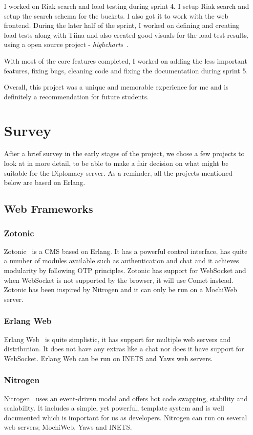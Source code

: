 \documentclass[11pt,a4paper]{report}
\begin{document}
I worked on Riak search and load testing during sprint 4. I setup Riak search
and setup the search schema for the buckets. I also got it to work with the web
frontend. During the later half of the sprint, I worked on defining and creating
load tests along with Tiina and also created good visuals for the load test
results, using a open source project - \emph{highcharts}~\cite{highcharts}.

With most of the core features completed, I worked on adding the less important
features, fixing bugs, cleaning code and fixing the documentation during sprint
5.

Overall, this project was a unique and memorable experience for me and is
definitely a recommendation for future students.
\chapter{Survey}
\label{appendix_b}
After a brief survey in the early stages of the project, we chose a few projects
to look at in more detail, to be able to make a fair decision on what might be
suitable for the Diplomacy server. As a reminder, all the projects mentioned
below are based on Erlang.

\section{Web Frameworks}
\subsection{Zotonic}
Zotonic~\cite{zotonic} is a CMS based on Erlang. It has a powerful control
interface, has quite a number of modules available such as authentication and
chat and it achieves modularity by following OTP principles. Zotonic has support
for WebSocket and when WebSocket is not supported by the browser, it will
use Comet instead. Zotonic has been inspired by Nitrogen and it can only be run
on a MochiWeb server.

\subsection{Erlang Web}
Erlang Web~\cite{erlangweb} is quite simplistic, it has support for multiple web
servers and distribution. It does not have any extras like a chat nor does it
have support for WebSocket. Erlang Web can be run on INETS and Yaws web
servers.

\subsection{Nitrogen}
Nitrogen~\cite{nitrogen} uses an event-driven model and offers hot code swapping,
stability and scalability. It includes a simple, yet powerful, template system
and is well documented which is important for us as developers. Nitrogen can run
on several web servers; MochiWeb, Yaws and INETS.
\end{document}
